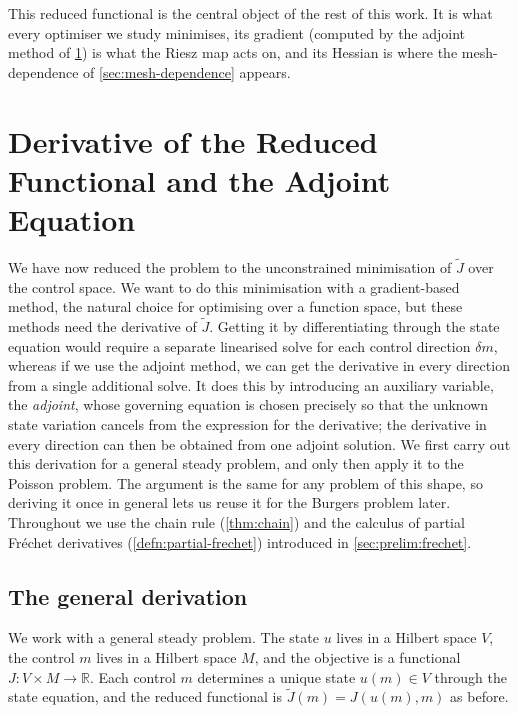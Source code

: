 \documentclass[a4paper,11pt]{article}
\newcommand{\R}{\mathbb{R}}
\newcommand{\Jt}{\tilde{J}}                  %
\newcommand{\Mspace}{M}
\theoremstyle{spacedplain} \newtheorem{theorem}[counter]{Theorem} \newtheorem{lemma}[counter]{Lemma} \newtheorem{prop}[counter]{Proposition} \newtheorem{cor}[counter]{Corollary}
\theoremstyle{spaceddefinition} \newtheorem{defn}[counter]{Definition} \newtheorem{example}[counter]{Example} \newtheorem{remark}[counter]{Remark}
\begin{document}
This reduced functional is the central object of the rest of this work. It is what every optimiser we study minimises, its gradient (computed by the adjoint method of \cref{sec:poisson-derivative}) is what the Riesz map acts on, and its Hessian is where the mesh-dependence of \cref{sec:mesh-dependence} appears.

\section{Derivative of the Reduced Functional and the Adjoint Equation}
\label{sec:poisson-derivative}

We have now reduced the problem to the unconstrained minimisation of $\Jt$ over the control space. We want to do this minimisation with a gradient-based method, the natural choice for optimising over a function space, but these methods need the derivative of $\Jt$. Getting it by differentiating through the state equation would require a separate linearised solve for each control direction $\delta m$, whereas if we use the adjoint method, we can get the derivative in every direction from a single additional solve. It does this by introducing an auxiliary variable, the \emph{adjoint}, whose governing equation is chosen precisely so that the unknown state variation cancels from the expression for the derivative; the derivative in every direction can then be obtained from one adjoint solution. We first carry out this derivation for a general steady problem, and only then apply it to the Poisson problem. The argument is the same for any problem of this shape, so deriving it once in general lets us reuse it for the Burgers problem later. Throughout we use the chain rule (\cref{thm:chain}) and the calculus of partial Fr{\'e}chet derivatives (\cref{defn:partial-frechet}) introduced in \cref{sec:prelim:frechet}.

\subsection{The general derivation}
\label{sec:deriv:general}

We work with a general steady problem. The state $u$ lives in a Hilbert space $V$, the control $m$ lives in a Hilbert space $\Mspace$, and the objective is a functional $J : V \times \Mspace \to \R$. Each control $m$ determines a unique state $u(m) \in V$ through the state equation, and the reduced functional is $\Jt(m) = J(u(m), m)$ as before.
\end{document}
